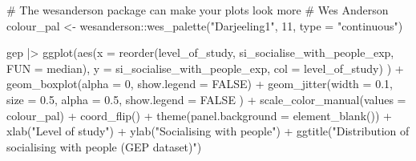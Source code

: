 \documentclass[
  letterpaper,
  DIV=11,
  numbers=noendperiod]{scrreprt}
\newenvironment{Shaded}{\begin{snugshade}}{\end{snugshade}}
\newcommand{\AttributeTok}[1]{\textcolor[rgb]{0.40,0.45,0.13}{#1}}
\newcommand{\CommentTok}[1]{\textcolor[rgb]{0.37,0.37,0.37}{#1}}
\newcommand{\ConstantTok}[1]{\textcolor[rgb]{0.56,0.35,0.01}{#1}}
\newcommand{\DecValTok}[1]{\textcolor[rgb]{0.68,0.00,0.00}{#1}}
\newcommand{\FloatTok}[1]{\textcolor[rgb]{0.68,0.00,0.00}{#1}}
\newcommand{\FunctionTok}[1]{\textcolor[rgb]{0.28,0.35,0.67}{#1}}
\newcommand{\NormalTok}[1]{\textcolor[rgb]{0.00,0.23,0.31}{#1}}
\newcommand{\OtherTok}[1]{\textcolor[rgb]{0.00,0.23,0.31}{#1}}
\newcommand{\SpecialCharTok}[1]{\textcolor[rgb]{0.37,0.37,0.37}{#1}}
\newcommand{\StringTok}[1]{\textcolor[rgb]{0.13,0.47,0.30}{#1}}
\begin{document}
\begin{Shaded}
\begin{Highlighting}[]
\CommentTok{\# The wesanderson package can make your plots look more}
\CommentTok{\# \textquotesingle{}Wes Anderson\textquotesingle{}}
\NormalTok{colour\_pal }\OtherTok{\textless{}{-}}
\NormalTok{  wesanderson}\SpecialCharTok{::}\FunctionTok{wes\_palette}\NormalTok{(}\StringTok{"Darjeeling1"}\NormalTok{,}
                           \DecValTok{11}\NormalTok{,}
                           \AttributeTok{type =} \StringTok{"continuous"}\NormalTok{)}

\NormalTok{gep }\SpecialCharTok{|\textgreater{}}
  \FunctionTok{ggplot}\NormalTok{(}\FunctionTok{aes}\NormalTok{(}\AttributeTok{x =} \FunctionTok{reorder}\NormalTok{(level\_of\_study,}
\NormalTok{                         si\_socialise\_with\_people\_exp,}
                         \AttributeTok{FUN =}\NormalTok{ median),}
             \AttributeTok{y =}\NormalTok{ si\_socialise\_with\_people\_exp,}
             \AttributeTok{col =}\NormalTok{ level\_of\_study)}
\NormalTok{         ) }\SpecialCharTok{+}
  \FunctionTok{geom\_boxplot}\NormalTok{(}\AttributeTok{alpha =} \DecValTok{0}\NormalTok{,}
               \AttributeTok{show.legend =} \ConstantTok{FALSE}\NormalTok{) }\SpecialCharTok{+}
  \FunctionTok{geom\_jitter}\NormalTok{(}\AttributeTok{width =} \FloatTok{0.1}\NormalTok{,}
              \AttributeTok{size =} \FloatTok{0.5}\NormalTok{,}
              \AttributeTok{alpha =} \FloatTok{0.5}\NormalTok{,}
              \AttributeTok{show.legend =} \ConstantTok{FALSE}
\NormalTok{              ) }\SpecialCharTok{+}
  \FunctionTok{scale\_color\_manual}\NormalTok{(}\AttributeTok{values =}\NormalTok{ colour\_pal) }\SpecialCharTok{+}
  \FunctionTok{coord\_flip}\NormalTok{() }\SpecialCharTok{+}
  \FunctionTok{theme}\NormalTok{(}\AttributeTok{panel.background =} \FunctionTok{element\_blank}\NormalTok{()) }\SpecialCharTok{+}
  \FunctionTok{xlab}\NormalTok{(}\StringTok{"Level of study"}\NormalTok{) }\SpecialCharTok{+}
  \FunctionTok{ylab}\NormalTok{(}\StringTok{"Socialising with people"}\NormalTok{) }\SpecialCharTok{+}
  \FunctionTok{ggtitle}\NormalTok{(}\StringTok{"Distribution of \textquotesingle{}socialising with people\textquotesingle{} (GEP dataset)"}\NormalTok{)}
\end{Highlighting}
\end{Shaded}
\end{document}
